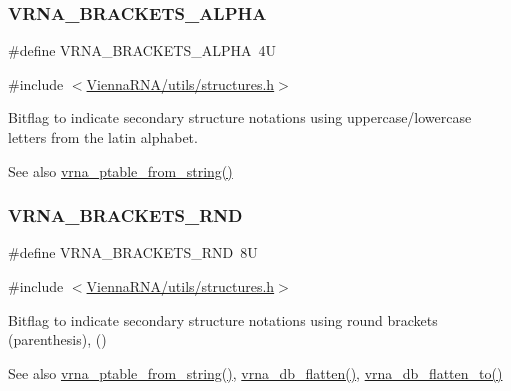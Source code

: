 \subsubsection{\texorpdfstring{VRNA\_BRACKETS\_ALPHA}{VRNA\_BRACKETS\_ALPHA}}
{\footnotesize\ttfamily \#define V\+R\+N\+A\+\_\+\+B\+R\+A\+C\+K\+E\+T\+S\+\_\+\+A\+L\+P\+HA~4U}



{\ttfamily \#include $<$\mbox{\hyperlink{utils_2structures_8h}{Vienna\+R\+N\+A/utils/structures.\+h}}$>$}



Bitflag to indicate secondary structure notations using uppercase/lowercase letters from the latin alphabet. 

\begin{DoxySeeAlso}{See also}
\mbox{\hyperlink{group__struct__utils__pair__table_gac76c9ef3de507748fb0416a59323362b}{vrna\+\_\+ptable\+\_\+from\+\_\+string()}} 
\end{DoxySeeAlso}
\mbox{\label{group__struct__utils__dot__bracket_gac92d5fa7c6625bce2670ece510a24fbd}} 
\subsubsection{\texorpdfstring{VRNA\_BRACKETS\_RND}{VRNA\_BRACKETS\_RND}}
{\footnotesize\ttfamily \#define V\+R\+N\+A\+\_\+\+B\+R\+A\+C\+K\+E\+T\+S\+\_\+\+R\+ND~8U}



{\ttfamily \#include $<$\mbox{\hyperlink{utils_2structures_8h}{Vienna\+R\+N\+A/utils/structures.\+h}}$>$}



Bitflag to indicate secondary structure notations using round brackets (parenthesis), {\ttfamily ()} 

\begin{DoxySeeAlso}{See also}
\mbox{\hyperlink{group__struct__utils__pair__table_gac76c9ef3de507748fb0416a59323362b}{vrna\+\_\+ptable\+\_\+from\+\_\+string()}}, \mbox{\hyperlink{group__struct__utils__dot__bracket_gafd1304f5a86e2e3f1425e725cde44fa2}{vrna\+\_\+db\+\_\+flatten()}}, \mbox{\hyperlink{group__struct__utils__dot__bracket_ga690425199c8b71545e7196e3af1436f8}{vrna\+\_\+db\+\_\+flatten\+\_\+to()}} 
\end{DoxySeeAlso}
\mbox{\label{group__struct__utils__dot__bracket_gaf41be40e79cb756c4e0bb8edb4d803d2}} 
